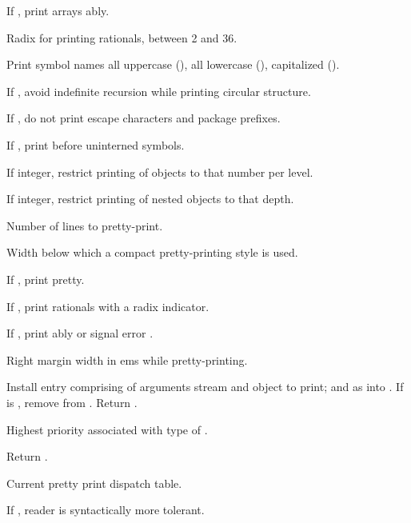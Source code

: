 \begin{LIST}{1cm}
  {
  If \T, print arrays ably.
  }

  {
  Radix for printing rationals, between 2 and 36.
  }

  {
  Print symbol names all uppercase (), all lowercase
  (), capitalized ().
  }

  {
  If \T, avoid indefinite recursion while printing circular
  structure. 
  }

  {
  If \NIL, do not print escape characters and package prefixes.
  }

  {
  If \T, print \kwd{:\#} before uninterned symbols.
  }

  {
  If integer, restrict printing of objects to that number per level.
  }

  {
  If integer, restrict printing of nested objects to that depth.
  }

  {
  Number of lines to pretty-print.
  }

  {
  Width below which a compact pretty-printing style is used.
  }

  {
  If \T, print pretty.
  }

  {
  If \T, print rationals with a radix indicator.
  }

  {
  If \T, print ably or signal error
  . 
  }

  {
  Right margin width in ems while pretty-printing.
  }

  {
  Install entry comprising  of arguments stream and
  object to print; and  as
   into . If 
  is \NIL, remove  from . Return \retval{\NIL}. 
  }

  {
  Highest priority  associated with type of
  . 
  }

  {
  Return .
  }

  {
  Current pretty print dispatch table.
  }

  {
  If \T, reader is syntactically more tolerant.
  }

\end{LIST}



